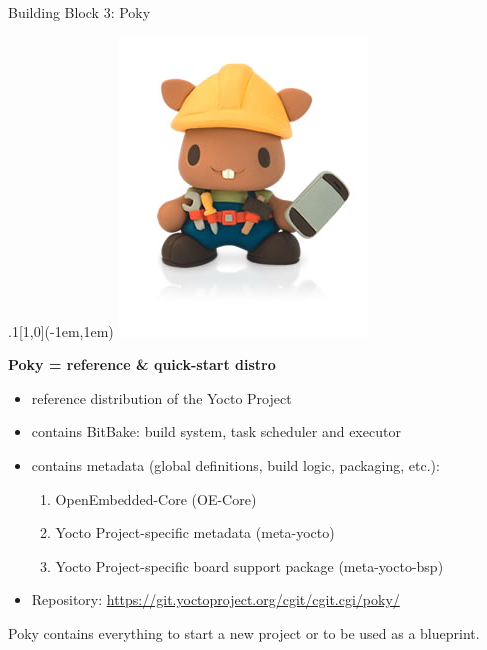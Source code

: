 \documentclass[ucs,9pt]{beamer}
\begin{document}
\begin{frame}
    {Building Block 3: Poky}

    \begin{textblock*}{.1\paperwidth}[1,0](\paperwidth-1em,1em)%
        \includegraphics[width=\linewidth]{images/poky-beaver}
    \end{textblock*}%

    \textbf{Poky = reference \& quick-start distro}
    \begin{itemize}
        \item reference distribution of the Yocto Project
        \item contains BitBake: build system, task scheduler and executor
        \item contains metadata (global definitions, build logic, packaging, etc.):
        \begin{enumerate}
            \item OpenEmbedded-Core (OE-Core)
            \item Yocto Project-specific metadata (meta-yocto)
            \item Yocto Project-specific board support package (meta-yocto-bsp)
        \end{enumerate}
        \item Repository: \url{https://git.yoctoproject.org/cgit/cgit.cgi/poky/}
    \end{itemize}
    \bigskip

    Poky contains everything to start a new project or to be used as a blueprint.
\end{frame}
\end{document}
